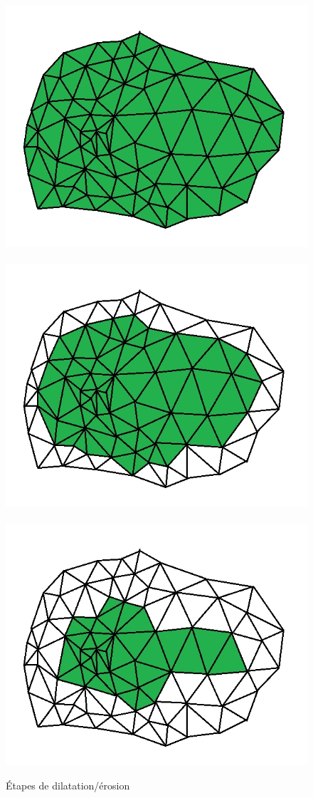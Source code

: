 ﻿\documentclass[12pt, twoside]{article}
\begin{document}
\begin{figure}[h]
\includegraphics[scale=0.3]{Dila4.jpg}~\includegraphics[scale=0.3]{Dila5.jpg}~\includegraphics[scale=0.3]{Dila6.jpg}
\caption{\label{fig:DilEro} Étapes de dilatation/érosion}
\end{figure}
\end{document}

